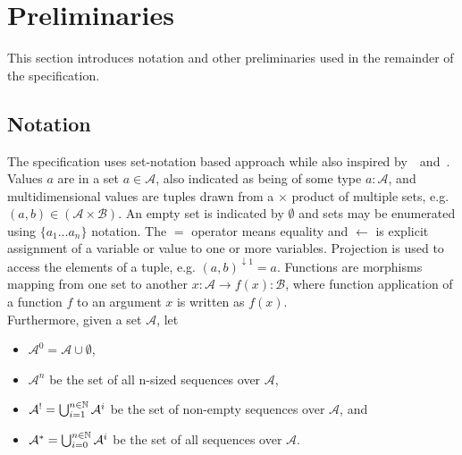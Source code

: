 \clearpage
\section{Preliminaries}\label{sec:prel}

This section introduces notation and other preliminaries used in the remainder
of the specification.

\subsection{Notation}

The specification uses set-notation based approach while also inspired
by~\cite{eutxo-2}~and~\cite{eutxo}. Values $a$ are in a set $a \in \mathcal{A}$,
also indicated as being of some type $a : \mathcal{A}$, and multidimensional values are
tuples drawn from a $\times$ product of multiple sets, e.g.
$(a,b) \in (\mathcal{A} \times \mathcal{B})$. An empty set is indicated by
$\emptyset$ and sets may be enumerated using $\{a_1 \dots a_n\}$ notation. The $=$ operator means
equality and $\gets$ is explicit assignment of a variable or value to one
or more variables. Projection is used to access the elements of a tuple, e.g.
${(a,b)}^{\downarrow1} = a$. Functions are morphisms mapping from one set to another
$x : \mathcal{A} \to f(x) : \mathcal{B}$, where function
application of a function $f$ to an argument $x$ is written as $f(x)$. \\

\noindent Furthermore, given a set $\mathcal{A}$, let
\begin{itemize}
	\item $\mathcal{A}^0 = \mathcal{A} \cup \emptyset$,
	\item $\mathcal{A}^n$ be the set of all n-sized sequences over $\mathcal{A}$,
	\item $\mathcal{A}^! = \bigcup_{i=1}^{n \in \mathbb{N}} \mathcal{A}^{i}$ be the set of non-empty sequences over $\mathcal{A}$, and
	\item $\mathcal{A}^* = \bigcup_{i=0}^{n \in \mathbb{N}} \mathcal{A}^{i}$ be
	      the set of all sequences over $\mathcal{A}$.
\end{itemize}


